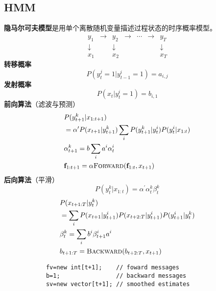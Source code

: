 \documentclass[10pt,a4paper]{ctexart}
\begin{document}
\begin{multicols}{3}
        \subsection{HMM}
        \textbf{隐马尔可夫模型}是用单个离散随机变量描述过程状态的时序概率模型。
        \begin{equation*}
            \begin{array}{ccccccc}
                y_1 & \rightarrow & y_2 & \rightarrow & \cdots & \rightarrow & y_T \\
                \downarrow & & \downarrow & & & & \downarrow \\
                x_1 & & x_2 & & & & x_T  
            \end{array}
        \end{equation*}
        \textbf{转移概率}
        \begin{equation*}
            P(y_t^j=1|y_{t-1}^i=1)=a_{i,j}
        \end{equation*}
        \textbf{发射概率}
        \begin{equation*}
            P(x_t|y_t^i=1)=b_{i,1}
        \end{equation*}
        \textbf{前向算法}（滤波与预测）
        \begin{align*}
            &P(y_{t+1}^k|x_{1:t+1})\\
            &=\alpha^\prime P(x_{t+1}|y_{t+1}^k)\sum_{i}P(y_{t+1}^k|y_t^i)P(y_t^i|x_{1:t})\\
            &\alpha_{t+1}^k=b\sum_i a^i \alpha_{t}^i\\
            &\mathbf{f}_{1:t+1}=\alpha \textsc{Forward}(\mathbf{f}_{1:t},x_{t+1})
        \end{align*}
        \textbf{后向算法}（平滑）
        \begin{equation*}
            P(y_t^k|x_{1:t})=\alpha^\prime \alpha_t^k \beta_t^k
        \end{equation*}
        \begin{align*}
            &P(x_{t+1:T}|y_t^k)\\
            &=\sum_{i}P(x_{t+1}|y_{t+1}^i)P(x_{t+2:T}|y_{t+1}^i)P(y_{t+1}^i|y_{t}^k)\\
            &\beta_{t}^k=\sum_{i}b^i\beta_{t+1}^i a^i\\
            &b_{t+1:T} = \textsc{Backward}(b_{t+2:T},x_{t+1})
        \end{align*}
        \noindent
        \begin{lstlisting}
            fv=new int[t+1];    // foward messages
            b=1;                // backward messages
            sv=new vector[t+1]; // smoothed estimates


\end{lstlisting}
\end{multicols}
\end{document}
